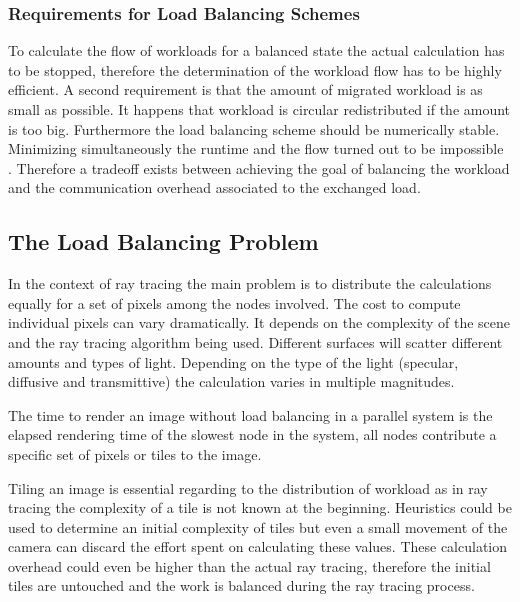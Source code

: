 \documentclass[DIV10, abstracton, openright, footsepline, headsepline, twoside, 9pt,
bigheadings]{scrreprt}
\begin{document}
\subsubsection*{Requirements for Load Balancing Schemes}
To calculate the flow of workloads for a balanced state the actual calculation
has to be stopped, therefore the determination of the workload flow has to be
highly efficient. A second requirement is that the amount of migrated
workload is as small as possible. It happens that workload is
circular redistributed if the amount is too big. Furthermore the load balancing
scheme should be numerically stable. Minimizing simultaneously the runtime and
the flow turned out to be impossible \cite{Arndt03}.
Therefore a tradeoff exists between achieving the goal of balancing the workload
and the communication overhead associated to the exchanged load.


\subsection{The Load Balancing Problem}
\label{sec:lbproblem}
In the context of ray tracing the main problem is to distribute the
calculations equally for a set of pixels among the nodes involved.  The cost to
compute individual pixels can vary dramatically. It depends on the complexity
of the scene and the ray tracing algorithm being used. Different surfaces will
scatter different amounts and types of light. Depending on the type of the
light (specular, diffusive and transmittive) the calculation varies in multiple
magnitudes.

The time to render an image without load balancing in a parallel
system is the elapsed rendering time of the slowest node in the system, all
nodes contribute a specific set of pixels or tiles to the image.

Tiling an image is essential regarding to the distribution of workload as in
ray tracing the complexity of a tile is not known at the beginning. Heuristics
could be used to determine an initial complexity of tiles but even a small
movement of the camera can discard the effort spent on calculating these values.
These calculation overhead could even be higher than the actual ray tracing,
therefore the initial tiles are untouched and the work is balanced during the
ray tracing process.
\end{document}
